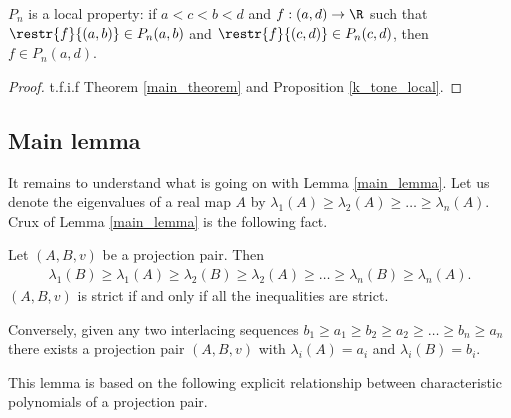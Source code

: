\begin{kor}
	$P_{n}$ is a local property: if $a < c < b < d$ and $f : (a, d) \to \R$ such that $\restr{f}{(a, b)} \in P_{n}(a, b)$ and $\restr{f}{(c, d)} \in P_{n}(c, d)$, then $f \in P_{n}(a, d)$.
\end{kor}
\begin{proof}
	t.f.i.f Theorem \ref{main_theorem} and Proposition \ref{k_tone_local}.
\end{proof}

\subsection{Main lemma}

It remains to understand what is going on with Lemma \ref{main_lemma}. Let us denote the eigenvalues of a real map $A$ by $\lambda_{1}(A) \geq \lambda_{2}(A) \geq \ldots \geq \lambda_{n}(A)$. Crux of Lemma \ref{main_lemma} is the following fact.

\begin{lem}\label{projection_eigenvalues}
	Let $(A, B, v)$ be a projection pair. Then
	\begin{align*}
		\lambda_{1}(B) \geq \lambda_{1}(A) \geq \lambda_{2}(B) \geq \lambda_{2}(A) \geq \ldots \geq \lambda_{n}(B) \geq \lambda_{n}(A).
	\end{align*}
	$(A, B, v)$ is strict if and only if all the inequalities are strict.

	Conversely, given any two interlacing sequences $b_{1} \geq a_{1} \geq b_{2} \geq a_{2} \geq \ldots \geq b_{n} \geq a_{n}$ there exists a projection pair $(A, B, v)$ with $\lambda_{i}(A) = a_{i}$ and $\lambda_{i}(B) = b_{i}$.
\end{lem}

This lemma is based on the following explicit relationship between characteristic polynomials of a projection pair.

